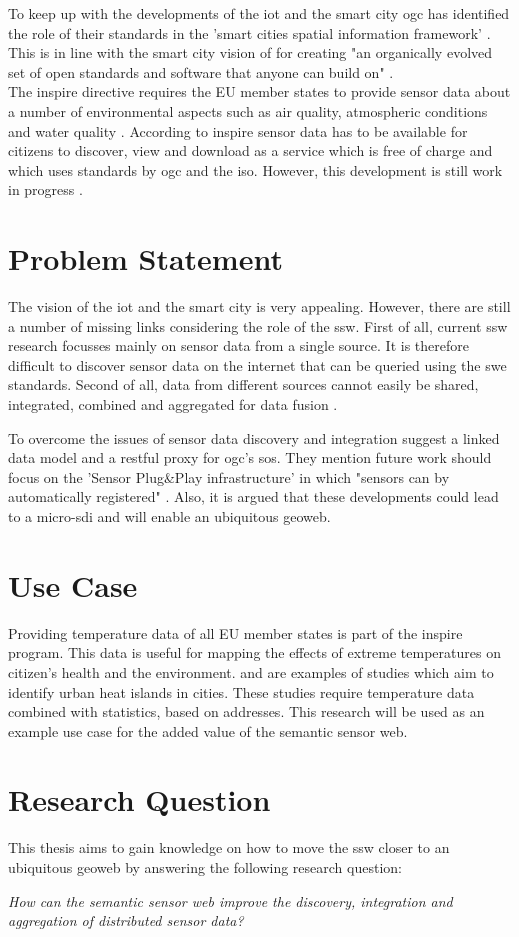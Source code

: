 To keep up with the developments of the \ac{iot} and the smart city \ac{ogc} has identified the role of their standards in the 'smart cities spatial information framework' \citep{SC:OGC}. This is in line with the smart city vision of \cite{SC:Townsend} for creating "an organically evolved set of open standards and software that anyone can build on" \citep[p. 290]{SC:Townsend}. \\

The \ac{inspire} directive requires the EU member states to provide sensor data about a number of environmental aspects such as air quality, atmospheric conditions and water quality \citep{SDI:INSPIRE2}. According to \ac{inspire} sensor data has to be available for citizens to discover, view and download as a service which is free of charge and which uses standards by \ac{ogc} and the \ac{iso}. However, this development is still work in progress \citep{SW:Kotsev}.   

\section{Problem Statement}
The vision of the \ac{iot} and the smart city is very appealing. However, there are still a number of missing links considering the role of the \ac{ssw}. First of all, current \ac{ssw} research focusses mainly on sensor data from a single source. It is therefore difficult to discover sensor data on the internet that can be queried using the \ac{swe} standards. Second of all, data from different sources cannot easily be shared, integrated, combined and aggregated for data fusion \citep{SSW:Wang, SSW:Ji, SSW:Corcho}. 

To overcome the issues of sensor data discovery and integration \cite{SSW:Janowicz} suggest a linked data model and a \ac{rest}ful proxy for \ac{ogc}’s \ac{sos}. They mention future work should focus on the 'Sensor Plug\&Play infrastructure' in which "sensors can by automatically registered" \cite[p. 21]{SSW:Janowicz}. Also, it is argued that these developments could lead to a \ac{micro-sdi} and will enable an ubiquitous geoweb.

\section{Use Case}
Providing temperature data of all EU member states is part of the \ac{inspire} program. This data is useful for mapping the effects of extreme temperatures on citizen's health and the environment. \cite{UC:vanderHoeven} and \cite{UC:vanderHoeven2} are examples of studies which aim to identify urban heat islands in cities. These studies require temperature data combined with statistics, based on addresses. This research will be used as an example use case for the added value of the semantic sensor web. 
 

\section{Research Question}
This thesis aims to gain knowledge on how to move the \ac{ssw} closer to an ubiquitous geoweb by answering the following research question: 

\textit{How can the semantic sensor web improve the discovery, integration and aggregation of distributed sensor data?}

\fi